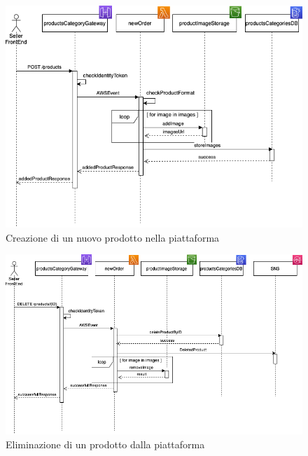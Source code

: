 \begin{figure}[H]
	\centering
	\includegraphics[scale=0.5]{Immagini/Backend/CreazioneProdotto.png}
	\caption{Creazione di un nuovo prodotto nella piattaforma}
	\label{fig:DiagrammaCreazioneProdotto}
\end{figure}
\begin{figure}[H]
	\centering
	\includegraphics[scale=0.5]{Immagini/Backend/EliminazioneProdotto.png}
	\caption{Eliminazione di un prodotto dalla piattaforma}
	\label{fig:DiagrammiEliminazioneProdotto}
\end{figure}
